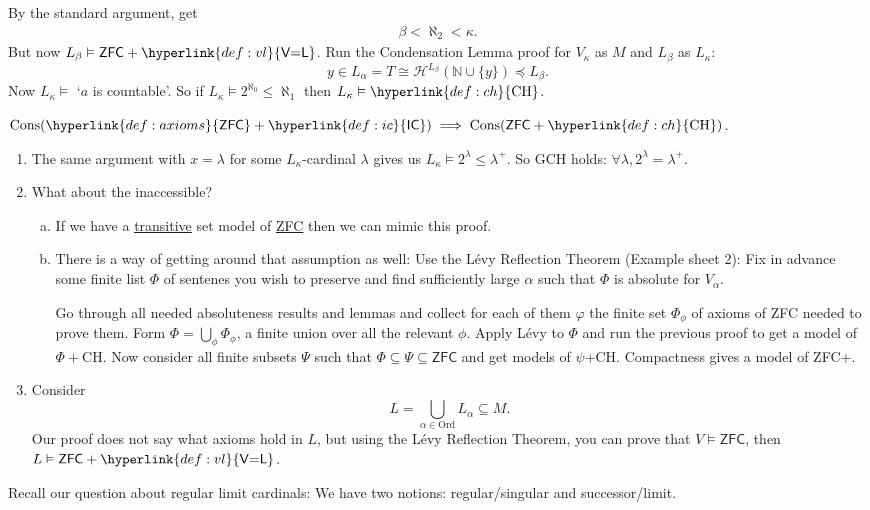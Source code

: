 \documentclass{article}
\newcommand{\1}{\mathbbm{1}}
\DeclareMathOperator{\cons}{Cons}
\let\models\vDash
\begin{document}
By the standard argument, get
\begin{align*}
  \beta < \aleph_2 < \kappa.
\end{align*}
But now $L_\beta \models \textsf{ZFC}+\hyperlink{def:vl}{\textsf{V=L}}$.
Run the Condensation Lemma proof for $V_\kappa$ as $M$ and $L_\beta$ as $L_\kappa$:
\begin{equation*}
  y \in L_\alpha = T \cong \mathcal{H}^{L_\beta}(\mathbb{N} \cup \{y\}) \preccurlyeq L_\beta.
\end{equation*}
Now $L_\kappa \models$ `$a$ is countable'. So if $L_\kappa \models 2^{\aleph_0} \leq \aleph_1$ then $L_\kappa \models \hyperlink{def:ch}{\text{CH}}$.
\begin{thm}
  $\cons(\hyperlink{def:axioms}{\textsf{ZFC}}+\hyperlink{def:ic}{\textsf{IC}}) \implies \cons(\textsf{ZFC}+\hyperlink{def:ch}{\text{CH}})$.
\end{thm}
\begin{remark}\leavevmode
  \begin{enumerate}[(1)]
    \item The same argument with $x=\lambda$ for some $L_\kappa$-cardinal $\lambda$ gives us $L_\kappa \models 2^\lambda \leq \lambda^+$. So GCH holds: $\forall \lambda, 2^\lambda = \lambda^+$.
    \item What about the inaccessible?
      \begin{enumerate}[(a)]
        \item If we have a \hyperlink{def:transitive}{transitive} set model of \hyperlink{def:axioms}{\textsf{ZFC}} then we can mimic this proof.
        \item There is a way of getting around that assumption as well:
          Use the L\'evy Reflection Theorem (Example sheet 2):
          Fix in advance some finite list $\Phi$ of sentenes you wish to preserve and find sufficiently large $\alpha$ such that $\Phi$ is absolute for $V_\alpha$.

          Go through all needed absoluteness results and lemmas and collect for each of them $\varphi$ the finite set $\Phi_\phi$ of axioms of \textsf{ZFC} needed to prove them. Form $\Phi = \bigcup_{\phi} \Phi_\phi$, a finite union over all the relevant $\phi$.
          Apply L\'evy to $\Phi$ and run the previous proof to get a model of $\Phi + \text{CH}$.
          Now consider all finite subsets $\Psi$ such that $\Phi \subseteq \Psi \subseteq \textsf{ZFC}$ and get models of $\psi$+CH.
          Compactness gives a model of \textsf{ZFC}+.
      \end{enumerate}
    \item Consider
      \begin{equation*}
        L = \bigcup_{\alpha \in \text{Ord}} L_\alpha \subseteq M.
      \end{equation*}
      Our proof does not say what axioms hold in $L$, but using the L\'evy Reflection Theorem, you can prove that $V \models \textsf{ZFC}$, then $L \models \textsf{ZFC}+\hyperlink{def:vl}{\textsf{V=L}}$.
  \end{enumerate}
\end{remark}
Recall our question about regular limit cardinals:
We have two notions: regular/singular and successor/limit.
\end{document}
